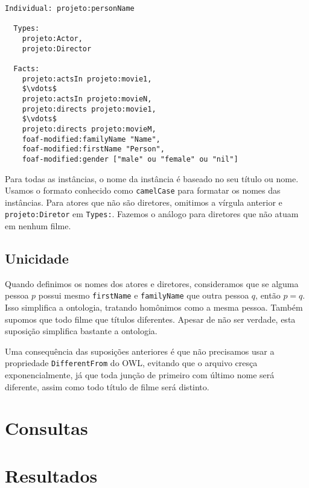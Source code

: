 \documentclass{article}
\newcommand{\code}[1]{\lstinline[mathescape=true]{#1}}
\begin{document}
\newpage

\begin{lstlisting}[frame=single,mathescape=true]
Individual: projeto:personName

  Types:
    projeto:Actor,
    projeto:Director

  Facts:
    projeto:actsIn projeto:movie1,
    $\vdots$
    projeto:actsIn projeto:movieN,
    projeto:directs projeto:movie1,
    $\vdots$
    projeto:directs projeto:movieM,
    foaf-modified:familyName "Name",
    foaf-modified:firstName "Person",
    foaf-modified:gender ["male" ou "female" ou "nil"]
\end{lstlisting}

Para todas as instâncias, o nome da instância é baseado no seu título ou nome. Usamos o formato
conhecido como \code{camelCase} para formatar os nomes das instâncias. Para atores que não são
diretores, omitimos a vírgula anterior e \code{projeto:Diretor} em \code{Types:}. Fazemos o análogo
para diretores que não atuam em nenhum filme.

\subsection{Unicidade}

Quando definimos os nomes dos atores e diretores, consideramos que se alguma pessoa $p$ possui
mesmo \code{firstName} e \code{familyName} que outra pessoa $q$, então $p=q$. Isso simplifica a
ontologia, tratando homônimos como a mesma pessoa. Também supomos que todo filme que títulos
diferentes. Apesar de não ser verdade, esta suposição simplifica bastante a ontologia.

Uma consequência das suposições anteriores é que não precisamos usar a propriedade
\code{DifferentFrom} do OWL, evitando que o arquivo cresça exponencialmente, já que toda junção de
primeiro com último nome será diferente, assim como todo título de filme será distinto.

\section{Consultas}

\section{Resultados}

\end{document}

